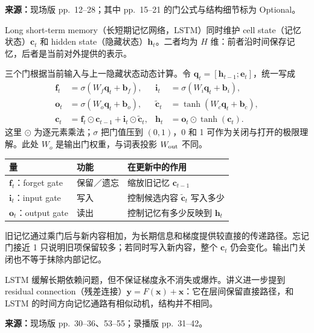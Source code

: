 \nopagebreak[4]
\textbf{来源：}现场版 pp.~12--28；其中 pp.~15--21 的门公式与结构细节标为 Optional。
\nopagebreak[4]

Long short-term memory（长短期记忆网络，LSTM）同时维护 cell state（记忆状态）$\mathbf c_t$ 和 hidden state（隐藏状态）$\mathbf h_t$。二者均为 $H$ 维：前者沿时间保存记忆，后者是当前对外提供的表示。

三个门根据当前输入与上一隐藏状态动态计算。令 $\mathbf q_t=[\mathbf h_{t-1};\mathbf e_t]$，统一写成
\begin{align*}
 \mathbf f_t&=\sigma(W_f\mathbf q_t+\mathbf b_f),&
 \mathbf i_t&=\sigma(W_i\mathbf q_t+\mathbf b_i),\\
 \mathbf o_t&=\sigma(W_o\mathbf q_t+\mathbf b_o),&
 \widetilde{\mathbf c}_t&=\tanh(W_c\mathbf q_t+\mathbf b_c),\\
 \mathbf c_t&=\mathbf f_t\odot\mathbf c_{t-1}
              +\mathbf i_t\odot\widetilde{\mathbf c}_t,&
 \mathbf h_t&=\mathbf o_t\odot\tanh(\mathbf c_t).
\end{align*}
这里 $\odot$ 为逐元素乘法；$\sigma$ 把门值压到 $(0,1)$，0 和 1 可作为关闭与打开的极限理解。此处 $W_o$ 是输出门权重，与词表投影 $W_{\rm out}$ 不同。

\begin{center}
\small
\begin{tabularx}{\textwidth}{@{}l l X@{}}
\toprule
量 & 功能 & 在更新中的作用 \\
\midrule
$\mathbf f_t$：forget gate & 保留／遗忘 & 缩放旧记忆 $\mathbf c_{t-1}$ \\
$\mathbf i_t$：input gate & 写入 & 控制候选内容 $\widetilde{\mathbf c}_t$ 写入多少 \\
$\mathbf o_t$：output gate & 读出 & 控制记忆有多少反映到 $\mathbf h_t$ \\
\bottomrule
\end{tabularx}
\end{center}
旧记忆通过乘门后与新内容相加，为长期信息和梯度提供较直接的传递路径。忘记门接近 1 只说明旧项保留较多；若同时写入新内容，整个 $\mathbf c_t$ 仍会变化。输出门关闭也不等于抹除内部记忆。

LSTM 缓解长期依赖问题，但不保证梯度永不消失或爆炸。讲义进一步提到 residual connection（残差连接）$\mathbf y=F(\mathbf x)+\mathbf x$：它在层间保留直接路径，和 LSTM 的时间方向记忆通路有相似动机，结构并不相同。

\nopagebreak[4]
\textbf{来源：}现场版 pp.~30--36、53--55；录播版 pp.~31--42。
\nopagebreak[4]

